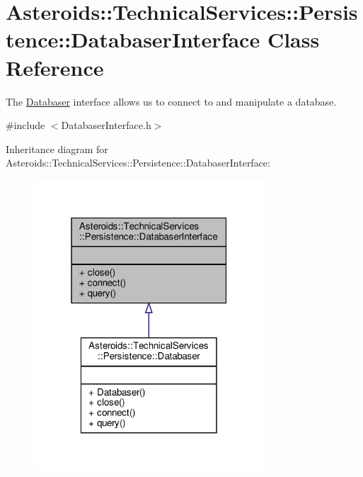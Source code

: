 \hypertarget{classAsteroids_1_1TechnicalServices_1_1Persistence_1_1DatabaserInterface}{}\section{Asteroids\+:\+:Technical\+Services\+:\+:Persistence\+:\+:Databaser\+Interface Class Reference}
\label{classAsteroids_1_1TechnicalServices_1_1Persistence_1_1DatabaserInterface}


The \hyperlink{classAsteroids_1_1TechnicalServices_1_1Persistence_1_1Databaser}{Databaser} interface allows us to connect to and manipulate a database.  




{\ttfamily \#include $<$Databaser\+Interface.\+h$>$}



Inheritance diagram for Asteroids\+:\+:Technical\+Services\+:\+:Persistence\+:\+:Databaser\+Interface\+:\nopagebreak
\begin{figure}[H]
\begin{center}
\leavevmode
\includegraphics[width=244pt]{classAsteroids_1_1TechnicalServices_1_1Persistence_1_1DatabaserInterface__inherit__graph}
\end{center}
\end{figure}


